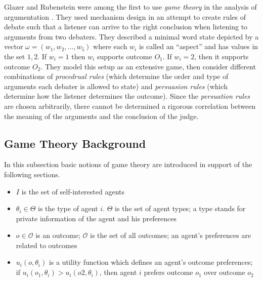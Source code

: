 \documentclass[12pt, a4paper]{article}
\begin{document}
Glazer and Rubenstein were among the first to use \emph{game theory} in the
analysis of argumentation \cite{17}. They used mechanism design in an attempt
to create rules of debate such that a listener can arrive to the right
conclusion when listening to arguments from two debaters. They described a
minimal word state depicted by a vector $\omega=(w_1, w_2, \dots, w_5)$ where
each $w_i$ is called an ``aspect'' and has values in the set ${1, 2}$. If
$w_i=1$ then $w_i$ supports outcome $O_1$. If $w_i=2$, then it supports outcome
$O_2$. They model this setup as an extensive game, then consider different
combinations of \emph{procedrual rules} (which determine the order and type of
arguments each debater is allowed to state) and \emph{persuasion rules} (which
determine how the listener determines the outcome). Since the \emph{persuation
rules} are chosen arbitrarily, there cannot be determined a rigorous
correlation between the meaning of the arguments and the conclusion of 
the judge.


\subsection{Game Theory Background}

In this subsection basic notions of game theory are introduced in support
of the following sections.

\begin{itemize}
    \item $I$ is the set of self-interested agents
    \item $\theta_i\in \Theta$ is the type of agent $i$. $\Theta$ is the set of
        agent types; a type stands for private information of the agent and his
        preferences
    \item $o \in \mathcal{O}$ is an outcome; $\mathcal{O}$ is the set of all
        outcomes; an agent's preferences are related to outcomes 
    \item $u_i(o, \theta_i)$ is a utility function which defines an agent's outcome
        preferences; if $u_i(o_1, \theta_i) > u_i(o2, \theta_i)$, then
        agent $i$ prefers outcome $o_1$ over outcome $o_2$
\end{itemize}
\end{document}
